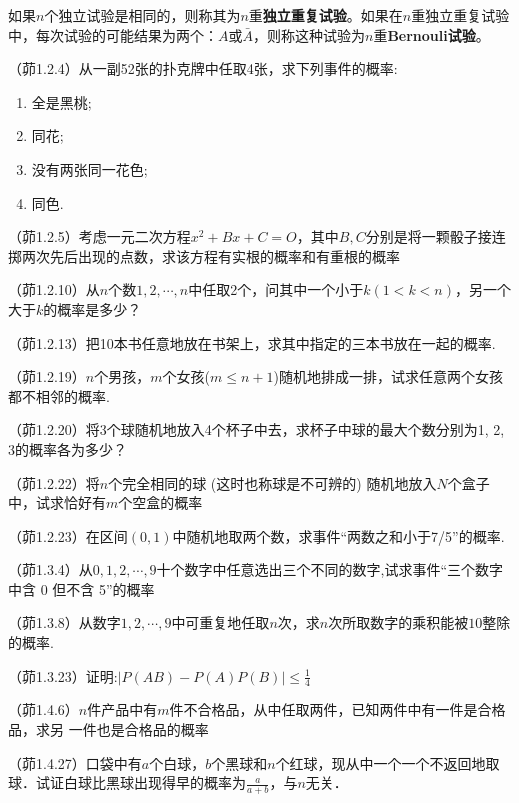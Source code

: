 \begin{definition}[Bernouli试验]\label{def:Bernouli_experiment}
    如果$n$个独立试验是相同的，则称其为$n$重\textbf{独立重复试验}。如果在$n$重独立重复试验中，每次试验的可能结果为两个：$A$或$\bar A$，则称这种试验为$n$重\textbf{Bernouli试验}。
\end{definition}



\begin{problemset}[错题记录]
    \item （茆1.2.4）从一副52张的扑克牌中任取4张，求下列事件的概率:
    \begin{enumerate}
        \item 全是黑桃;
        \item 同花;
        \item 没有两张同一花色;
        \item 同色.
    \end{enumerate}
    \item （茆1.2.5）考虑一元二次方程$x^2+Bx+C=O$，其中$B,C$分别是将一颗骰子接连掷两次先后出现的点数，求该方程有实根的概率和有重根的概率
    \item （茆1.2.10）从$n$个数$1, 2, \cdots, n$中任取2个，问其中一个小于$k (1 < k < n)$，另一个大于$k$的概率是多少？
    \item （茆1.2.13）把10本书任意地放在书架上，求其中指定的三本书放在一起的概率.
    \item （茆1.2.19）$n$个男孩，$m$个女孩($m \le n + 1$)随机地排成一排，试求任意两个女孩都不相邻的概率.
    \item （茆1.2.20）将3个球随机地放入4个杯子中去，求杯子中球的最大个数分别为1, 2, 3的概率各为多少？
    \item （茆1.2.22）将$n$个完全相同的球 (这时也称球是不可辨的) 随机地放入$N$个盒子中，试求恰好有$m$个空盒的概率
    \item （茆1.2.23）在区间$(0,1)$中随机地取两个数，求事件“两数之和小于7/5”的概率.
    \item （茆1.3.4）从$0, 1, 2, \cdots ,9$十个数字中任意选出三个不同的数字,试求事件“三个数字中含 0 但不含 5”的概率
    \item （茆1.3.8）从数字$1, 2, \cdots ,9$中可重复地任取$n$次，求$n$次所取数字的乘积能被$10$整除的概率.
    \item （茆1.3.23）证明:$\lvert P(AB) - P(A)P(B) \rvert \le \frac1{4}$
    \item （茆1.4.6）$n$件产品中有$m$件不合格品，从中任取两件，已知两件中有一件是合格品，求另 一件也是合格品的概率
    \item （茆1.4.27）口袋中有$a$个白球，$b$个黑球和$n$个红球，现从中一个一个不返回地取球．试证白球比黑球出现得早的概率为$\frac{a}{a+b}$，与$n$无关．

\end{problemset}
